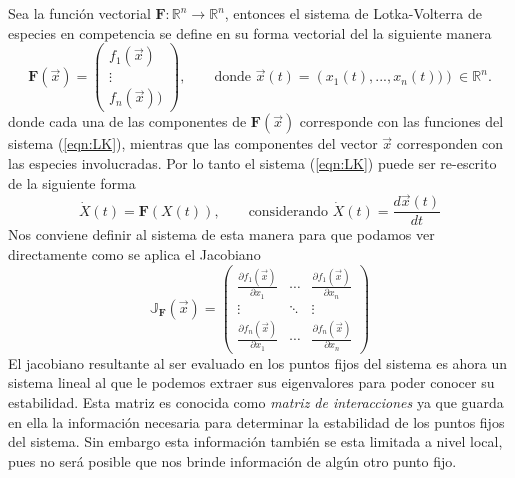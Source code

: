 \newpage
\begin{definición}\label{def:LKVectorial}
	Sea la función vectorial $\mathbf{F}:\mathbb{R}^n\to\mathbb{R}^n$, entonces el sistema de Lotka-Volterra de especies en competencia se define en su forma vectorial del la siguiente manera
	\begin{equation}\label{eqn:Fmatricial}
		\mathbf{F}(\vec{x})=\begin{pmatrix}
			f_1(\vec{x})\\
			\vdots\\
			f_n(\vec{x}))
		\end{pmatrix},\qquad\text{donde $\vec{x}(t)=\left(x_1(t),...,x_n(t))\right)\in\mathbb{R}^n$.}
	\end{equation}
	donde cada una de las componentes de $\mathbf{F}(\vec{x})$ corresponde con las funciones del sistema (\ref{eqn:LK}), mientras que las componentes del vector $\vec{x}$ corresponden con las especies involucradas. Por lo tanto el sistema (\ref{eqn:LK}) puede ser re-escrito de la siguiente forma
	\begin{equation}\label{eqn:LKmatricial}
		\dot{X}(t) = \mathbf{F}(X(t)),\qquad\text{considerando $\dot{X}(t)=\frac{d\vec{x}(t)}{dt}$}
	\end{equation}
	Nos conviene definir al sistema de esta manera para que podamos ver directamente como se aplica el Jacobiano 
	\begin{equation}\label{eqn:Jacobiano}
		\mathbb{J}_\mathbf{F}(\vec{x}) = \begin{pmatrix}
			\frac{\partial f_1(\vec{x})}{\partial x_1} & \cdots &\frac{\partial f_1(\vec{x})}{\partial x_n}\\
			\vdots & \ddots & \vdots\\
			\frac{\partial f_n(\vec{x})}{\partial x_1} & \cdots &\frac{\partial f_n(\vec{x})}{\partial x_n}
		\end{pmatrix}
	\end{equation}
	El jacobiano resultante al ser evaluado en los puntos fijos del sistema es ahora un sistema lineal al que le podemos extraer sus eigenvalores para poder conocer su estabilidad. Esta matriz es conocida como \textit{matriz de interacciones} ya que guarda en ella la información necesaria para determinar la estabilidad de los puntos fijos del sistema. Sin embargo esta información también se esta limitada a nivel local, pues no será posible que nos brinde información de algún  otro punto fijo.
\end{definición}

